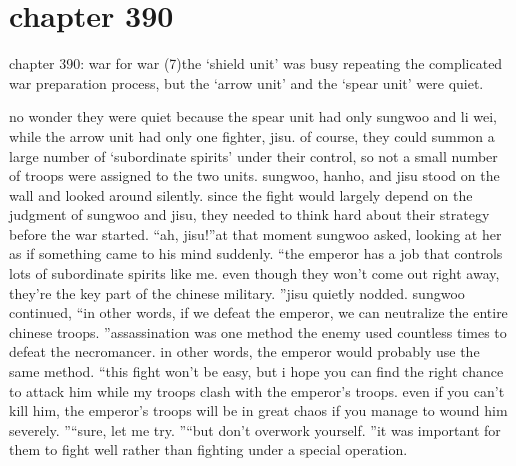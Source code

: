 \section{chapter 390}

chapter 390: war for war (7)the ‘shield unit’ was busy repeating the complicated war preparation process, but the ‘arrow unit’ and the ‘spear unit’ were quiet.





no wonder they were quiet because the spear unit had only sungwoo and li wei, while the arrow unit had only one fighter, jisu.
of course, they could summon a large number of ‘subordinate spirits’ under their control, so not a small number of troops were assigned to the two units.
sungwoo, hanho, and jisu stood on the wall and looked around silently.
since the fight would largely depend on the judgment of sungwoo and jisu, they needed to think hard about their strategy before the war started.
“ah, jisu!”at that moment sungwoo asked, looking at her as if something came to his mind suddenly.
“the emperor has a job that controls lots of subordinate spirits like me.
 even though they won’t come out right away, they’re the key part of the chinese military.
”jisu quietly nodded.
sungwoo continued, “in other words, if we defeat the emperor, we can neutralize the entire chinese troops.
”assassination was one method the enemy used countless times to defeat the necromancer.
in other words, the emperor would probably use the same method.
“this fight won’t be easy, but i hope you can find the right chance to attack him while my troops clash with the emperor’s troops.
 even if you can’t kill him, the emperor’s troops will be in great chaos if you manage to wound him severely.
”“sure, let me try.
”“but don’t overwork yourself.
”it was important for them to fight well rather than fighting under a special operation.

